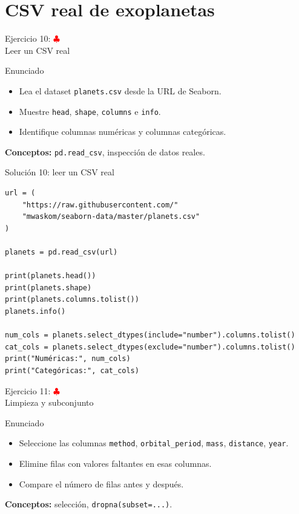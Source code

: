 \documentclass[10pt]{beamer}
\begin{document}
\section{CSV real de exoplanetas}

\begin{frame}{Ejercicio 10: \hfill \textcolor{red}{$\clubsuit$} \\ Leer un CSV real}
  \begin{block}{Enunciado}
    \begin{itemize}
      \item Lea el dataset \texttt{planets.csv} desde la URL de Seaborn.
      \item Muestre \texttt{head}, \texttt{shape}, \texttt{columns} e \texttt{info}.
      \item Identifique columnas numéricas y columnas categóricas.
    \end{itemize}
  \end{block}
  \textbf{Conceptos:} \texttt{pd.read\_csv}, inspección de datos reales.
\end{frame}

\begin{solutionblock}
\begin{frame}[fragile,shrink=5]{Solución 10: leer un CSV real}
\begin{verbatim}
url = (
    "https://raw.githubusercontent.com/"
    "mwaskom/seaborn-data/master/planets.csv"
)

planets = pd.read_csv(url)

print(planets.head())
print(planets.shape)
print(planets.columns.tolist())
planets.info()

num_cols = planets.select_dtypes(include="number").columns.tolist()
cat_cols = planets.select_dtypes(exclude="number").columns.tolist()
print("Numéricas:", num_cols)
print("Categóricas:", cat_cols)
\end{verbatim}
\end{frame}
\end{solutionblock}

\begin{frame}{Ejercicio 11: \hfill \textcolor{red}{$\clubsuit$} \\ Limpieza y subconjunto}
  \begin{block}{Enunciado}
    \begin{itemize}
      \item Seleccione las columnas \texttt{method}, \texttt{orbital\_period}, \texttt{mass}, \texttt{distance}, \texttt{year}.
      \item Elimine filas con valores faltantes en esas columnas.
      \item Compare el número de filas antes y después.
    \end{itemize}
  \end{block}
  \textbf{Conceptos:} selección, \texttt{dropna(subset=...)}.
\end{frame}
\end{document}
